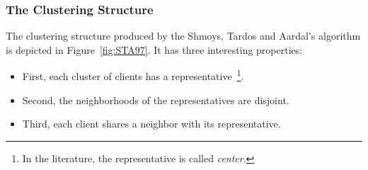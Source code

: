 \documentclass[oneside,final]{ucr}
\def\ssp{\def\baselinestretch{1.0}\large\normalsize}
\begin{document}
\subsubsection{The Clustering Structure}
The clustering structure produced by the Shmoys, Tardos and
Aardal's algorithm is depicted in Figure~\ref{fig:STA97}. It
has three interesting properties:
\begin{itemize}
\item First, each cluster of clients has a
  representative~\footnote{In the literature, the
    representative is called \emph{center}.}.
\item Second, the neighborhoods of the representatives are
  disjoint.
\item Third, each client shares a neighbor with its
  representative.
\end{itemize}
%
%
\ssp
\end{document}
